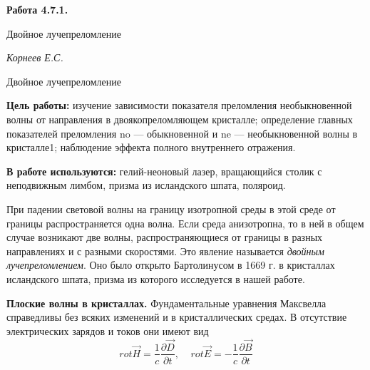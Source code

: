 \documentclass[14pt]{article}
\begin{document}
\begin{titlepage}
	\begin{center}
		\fontsize{18pt}{20pt}\selectfont
		\textbf{Работа 4.7.1.}	
	
		\vspace{5cm}
		\fontsize{24pt}{25pt}\selectfont
		Двойное лучепреломление
	\end{center}
	\begin{flushright}
		\fontsize{18pt}{20pt}\selectfont
		\vspace{14cm}
		\hspace{-3cm}
		\textit{Корнеев Е.С.}
	\end{flushright}		
\end{titlepage}

\begin{center}
	\fontsize{16pt}{18pt}\selectfont
	Двойное лучепреломление
\end{center}


\fontsize{14pt}{16pt}\selectfont

\vspace{0.5cm}
\textbf{Цель работы:} изучение зависимости показателя преломления
необыкновенной волны от направления в двоякопреломляющем кристалле;
определение главных показателей преломления no — обыкновенной
и ne — необыкновенной волны в кристалле1; наблюдение эффекта
полного внутреннего отражения.

\vspace{0.5cm}
\textbf{В работе используются:} гелий-неоновый лазер, вращающийся столик
с неподвижным лимбом, призма из исландского шпата, поляроид.

\vspace{1cm}

При падении световой волны на границу изотропной среды в этой
среде от границы распространяется одна волна. Если среда анизотропна,
то в ней в общем случае возникают две волны, распространяющиеся
от границы в разных направлениях и с разными скоростями. Это явление
называется \textsl{двойным лучепреломлением}. Оно было открыто Бартолинусом
в 1669 г. в кристаллах исландского шпата, призма из которого
исследуется в нашей работе.

\textbf{Плоские волны в кристаллах.} Фундаментальные уравнения Максвелла
справедливы без всяких изменений и в кристаллических средах.
В отсутствие электрических зарядов и токов они имеют вид
\begin{equation}
rot\vec{H} = \frac{1}{c}\frac{\partial\vec{D}}{\partial t},~~~~~rot\vec{E} = -\frac{1}{c}\frac{\partial\vec{B}}{\partial t}
\end{equation}
\end{document}
